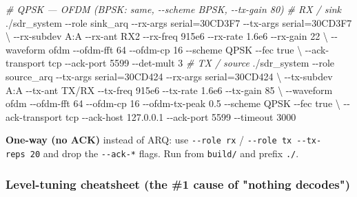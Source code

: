 \documentclass[
  10pt,
]{article}
\newenvironment{Shaded}{\begin{snugshade}}{\end{snugshade}}
\newcommand{\AttributeTok}[1]{\textcolor[rgb]{0.77,0.63,0.00}{#1}}
\newcommand{\CommentTok}[1]{\textcolor[rgb]{0.56,0.35,0.01}{\textit{#1}}}
\newcommand{\DataTypeTok}[1]{\textcolor[rgb]{0.13,0.29,0.53}{#1}}
\newcommand{\ExtensionTok}[1]{#1}
\newcommand{\NormalTok}[1]{#1}
\begin{document}
\begin{Shaded}
\begin{Highlighting}[]
\CommentTok{\# QPSK — OFDM   (BPSK: same, {-}{-}scheme BPSK, {-}{-}tx{-}gain 80)}
\CommentTok{\# RX / sink}
\ExtensionTok{./sdr\_system} \AttributeTok{{-}{-}role}\NormalTok{ sink\_arq }\AttributeTok{{-}{-}rx{-}args}\NormalTok{ serial=30CD3F7 }\AttributeTok{{-}{-}tx{-}args}\NormalTok{ serial=30CD3F7 }\DataTypeTok{\textbackslash{}}
  \AttributeTok{{-}{-}rx{-}subdev}\NormalTok{ A:A }\AttributeTok{{-}{-}rx{-}ant}\NormalTok{ RX2 }\AttributeTok{{-}{-}rx{-}freq}\NormalTok{ 915e6 }\AttributeTok{{-}{-}rx{-}rate}\NormalTok{ 1.6e6 }\AttributeTok{{-}{-}rx{-}gain}\NormalTok{ 22 }\DataTypeTok{\textbackslash{}}
  \AttributeTok{{-}{-}waveform}\NormalTok{ ofdm }\AttributeTok{{-}{-}ofdm{-}fft}\NormalTok{ 64 }\AttributeTok{{-}{-}ofdm{-}cp}\NormalTok{ 16 }\AttributeTok{{-}{-}scheme}\NormalTok{ QPSK }\AttributeTok{{-}{-}fec}\NormalTok{ true }\DataTypeTok{\textbackslash{}}
  \AttributeTok{{-}{-}ack{-}transport}\NormalTok{ tcp }\AttributeTok{{-}{-}ack{-}port}\NormalTok{ 5599 }\AttributeTok{{-}{-}det{-}mult}\NormalTok{ 3}
\CommentTok{\# TX / source}
\ExtensionTok{./sdr\_system} \AttributeTok{{-}{-}role}\NormalTok{ source\_arq }\AttributeTok{{-}{-}tx{-}args}\NormalTok{ serial=30CD424 }\AttributeTok{{-}{-}rx{-}args}\NormalTok{ serial=30CD424 }\DataTypeTok{\textbackslash{}}
  \AttributeTok{{-}{-}tx{-}subdev}\NormalTok{ A:A }\AttributeTok{{-}{-}tx{-}ant}\NormalTok{ TX/RX }\AttributeTok{{-}{-}tx{-}freq}\NormalTok{ 915e6 }\AttributeTok{{-}{-}tx{-}rate}\NormalTok{ 1.6e6 }\AttributeTok{{-}{-}tx{-}gain}\NormalTok{ 85 }\DataTypeTok{\textbackslash{}}
  \AttributeTok{{-}{-}waveform}\NormalTok{ ofdm }\AttributeTok{{-}{-}ofdm{-}fft}\NormalTok{ 64 }\AttributeTok{{-}{-}ofdm{-}cp}\NormalTok{ 16 }\AttributeTok{{-}{-}ofdm{-}tx{-}peak}\NormalTok{ 0.5 }\AttributeTok{{-}{-}scheme}\NormalTok{ QPSK }\AttributeTok{{-}{-}fec}\NormalTok{ true }\DataTypeTok{\textbackslash{}}
  \AttributeTok{{-}{-}ack{-}transport}\NormalTok{ tcp }\AttributeTok{{-}{-}ack{-}host}\NormalTok{ 127.0.0.1 }\AttributeTok{{-}{-}ack{-}port}\NormalTok{ 5599 }\AttributeTok{{-}{-}timeout}\NormalTok{ 3000}
\end{Highlighting}
\end{Shaded}

\textbf{One-way (no ACK)} instead of ARQ: use \texttt{-\/-role\ rx} /
\texttt{-\/-role\ tx\ -\/-tx-reps\ 20} and drop the \texttt{-\/-ack-*}
flags. Run from \texttt{build/} and prefix \texttt{./}.

\hypertarget{level-tuning-cheatsheet-the-1-cause-of-nothing-decodes}{%
\subsubsection{Level-tuning cheatsheet (the \#1 cause of "nothing
decodes")}\label{level-tuning-cheatsheet-the-1-cause-of-nothing-decodes}}
\end{document}
